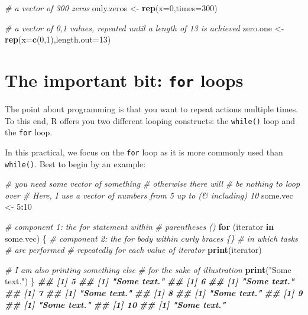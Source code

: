 \documentclass[
]{book}
\newenvironment{Shaded}{\begin{snugshade}}{\end{snugshade}}
\newcommand{\AttributeTok}[1]{\textcolor[rgb]{0.13,0.29,0.53}{#1}}
\newcommand{\CommentTok}[1]{\textcolor[rgb]{0.56,0.35,0.01}{\textit{#1}}}
\newcommand{\ControlFlowTok}[1]{\textcolor[rgb]{0.13,0.29,0.53}{\textbf{#1}}}
\newcommand{\DecValTok}[1]{\textcolor[rgb]{0.00,0.00,0.81}{#1}}
\newcommand{\DocumentationTok}[1]{\textcolor[rgb]{0.56,0.35,0.01}{\textbf{\textit{#1}}}}
\newcommand{\FunctionTok}[1]{\textcolor[rgb]{0.13,0.29,0.53}{\textbf{#1}}}
\newcommand{\NormalTok}[1]{#1}
\newcommand{\OtherTok}[1]{\textcolor[rgb]{0.56,0.35,0.01}{#1}}
\newcommand{\SpecialCharTok}[1]{\textcolor[rgb]{0.81,0.36,0.00}{\textbf{#1}}}
\newcommand{\StringTok}[1]{\textcolor[rgb]{0.31,0.60,0.02}{#1}}
\begin{document}
\begin{Shaded}
\begin{Highlighting}[]
\CommentTok{\# a vector of 300 zeros}
\NormalTok{only.zeros }\OtherTok{\textless{}{-}} \FunctionTok{rep}\NormalTok{(}\AttributeTok{x=}\DecValTok{0}\NormalTok{,}\AttributeTok{times=}\DecValTok{300}\NormalTok{)}

\CommentTok{\# a vector of 0,1 values, repeated until a length of 13 is achieved}
\NormalTok{zero.one }\OtherTok{\textless{}{-}} \FunctionTok{rep}\NormalTok{(}\AttributeTok{x=}\FunctionTok{c}\NormalTok{(}\DecValTok{0}\NormalTok{,}\DecValTok{1}\NormalTok{),}\AttributeTok{length.out=}\DecValTok{13}\NormalTok{)}
\end{Highlighting}
\end{Shaded}

\section{\texorpdfstring{The important bit: \texttt{for} loops}{The important bit: for loops}}\label{the-important-bit-for-loops}

The point about programming is that you want to repeat actions multiple times. To this end, R offers you two different looping constructs: the \texttt{while()} loop and the \texttt{for} loop.

In this practical, we focus on the \texttt{for} loop as it is more commonly used than \texttt{while()}. Best to begin by an example:

\begin{Shaded}
\begin{Highlighting}[]
\CommentTok{\# you need some vector of something}
\CommentTok{\# otherwise there will}
\CommentTok{\# be nothing to loop over}
\CommentTok{\# Here, I use a vector of numbers from 5 up to (\& including) 10}
\NormalTok{some.vec }\OtherTok{\textless{}{-}} \DecValTok{5}\SpecialCharTok{:}\DecValTok{10}

\CommentTok{\# component 1: the for statement within }
\CommentTok{\# parentheses ()}
\ControlFlowTok{for}\NormalTok{ (iterator }\ControlFlowTok{in}\NormalTok{ some.vec) }
\NormalTok{\{}
    \CommentTok{\# component 2: the for body within curly braces \{\} }
    \CommentTok{\# in which tasks }
    \CommentTok{\# are performed}
    \CommentTok{\# repeatedly for each value of iterator}
    \FunctionTok{print}\NormalTok{(iterator)}
    
    \CommentTok{\# I am also printing something else}
    \CommentTok{\# for the sake of illustration}
    \FunctionTok{print}\NormalTok{(}\StringTok{"Some text."}\NormalTok{)}
\NormalTok{\}}
\DocumentationTok{\#\# [1] 5}
\DocumentationTok{\#\# [1] "Some text."}
\DocumentationTok{\#\# [1] 6}
\DocumentationTok{\#\# [1] "Some text."}
\DocumentationTok{\#\# [1] 7}
\DocumentationTok{\#\# [1] "Some text."}
\DocumentationTok{\#\# [1] 8}
\DocumentationTok{\#\# [1] "Some text."}
\DocumentationTok{\#\# [1] 9}
\DocumentationTok{\#\# [1] "Some text."}
\DocumentationTok{\#\# [1] 10}
\DocumentationTok{\#\# [1] "Some text."}
\end{Highlighting}
\end{Shaded}
\end{document}
